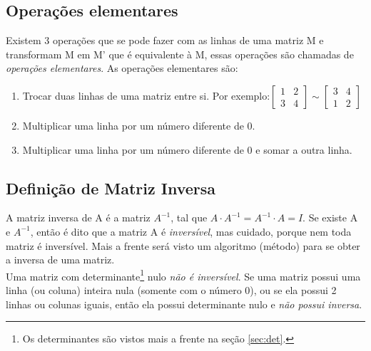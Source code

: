 \subsection{Operações elementares}
\label{subsec:ope-ele}
Existem 3 operações que se pode fazer com as linhas de uma matriz M e transformam M em M' que é equivalente à M, essas operações são chamadas de \textit{operações elementares}. 
As operações elementares são:
\begin{enumerate}
  \item Trocar duas linhas de uma matriz entre si. Por exemplo:$
  \begin{bmatrix}
  1 & 2 \\ 3 & 4  
  \end{bmatrix}
  \sim
  \begin{bmatrix}
    3 & 4 \\1 & 2
  \end{bmatrix}
  $
  \item Multiplicar uma linha por um número diferente de 0.
  \item Multiplicar uma linha por um número diferente de 0 e somar a outra linha.
\end{enumerate}
\subsection{Definição de Matriz Inversa}
A matriz inversa de A é a matriz $A^{-1}$, tal que $A\cdot A^{-1}=A^{-1}\cdot A = I$. Se existe A e $A^{-1}$, então é dito que a matriz A é \textit{inversível}, mas cuidado, porque nem toda matriz é inversível. Mais a frente será visto um algoritmo (método) para se obter a inversa de uma matriz.\\
Uma matriz com determinante\footnote{Os determinantes são vistos mais a frente na seção \ref{sec:det}.} nulo \textit{não é inversível}. Se uma matriz possui uma linha (ou coluna) inteira nula (somente com o número 0), ou se ela possui 2 linhas ou colunas iguais, então ela possui determinante nulo e \textit{não possui inversa}.
